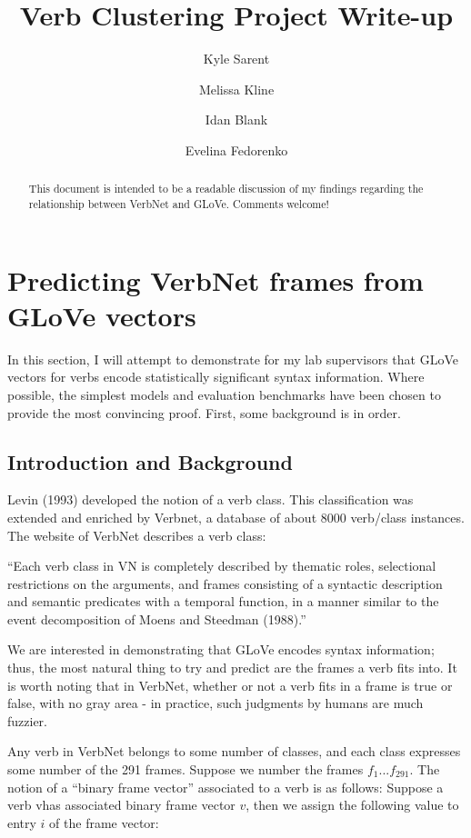 \documentclass[a4paper]{article}
\title{Verb Clustering Project Write-up}
\author[1]{Kyle Sarent}
\author[2]{Melissa Kline}
\author[2]{Idan Blank}
\author[3,4]{Evelina Fedorenko}
\affil[1]{Harvard University}
\affil[2]{Department of Brain \& Cognitive Sciences, Massachusetts Institute of Technology}
\affil[3]{Massachusetts General Hospital}
\affil[4]{Harvard Medical School}
\begin{document}
\maketitle

\begin{abstract}
This document is intended to be a readable discussion of my findings regarding the relationship between VerbNet and GLoVe. Comments welcome!
\end{abstract}

\section{Predicting VerbNet frames from GLoVe vectors}

In this section, I will attempt to demonstrate for my lab supervisors that GLoVe vectors for verbs encode statistically significant syntax information. Where possible, the simplest models and evaluation benchmarks have been chosen to provide the most convincing proof. First, some background is in order.

\subsection{Introduction and Background}
Levin (1993) developed the notion of a verb class. This classification was extended and enriched by Verbnet, a database of about 8000 verb/class instances. The website of VerbNet describes a verb class:

\begin{displayquote}
“Each verb class in VN is completely described by thematic roles, selectional restrictions on the arguments, and frames consisting of a syntactic description and semantic predicates with a temporal function, in a manner similar to the event decomposition of Moens and Steedman (1988).”
\end{displayquote}

We are interested in demonstrating that GLoVe encodes syntax information; thus, the most natural thing to try and predict are the frames a verb fits into. It is worth noting that in VerbNet, whether or not a verb fits in a frame is true or false, with no gray area - in practice, such judgments by humans are much fuzzier. 


Any verb in VerbNet belongs to some number of classes, and each class expresses some number of the 291 frames. Suppose we number the frames $f_1... f_{291}$. The notion of a “binary frame vector” associated to a verb is as follows: Suppose a verb vhas associated binary frame vector $v$, then we assign the following value to entry $i$ of the frame vector:
\end{document}
